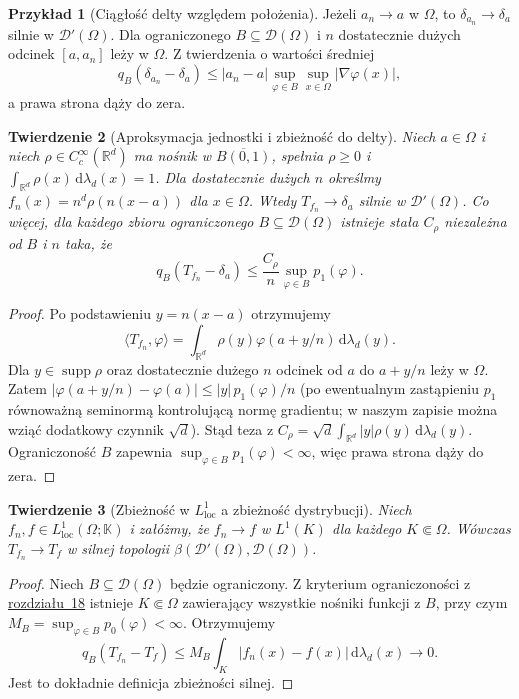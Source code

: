 \documentclass[11pt,a4paper]{article}
\numberwithin{equation}{section}
\theoremstyle{plain}
\newtheorem{twierdzenie}{Twierdzenie}[section]
\theoremstyle{definition}
\newtheorem{przyklad}[twierdzenie]{Przykład}
\theoremstyle{remark}
\newcommand{\R}{\mathbb R}
\newcommand{\K}{\mathbb K}
\DeclareMathOperator{\supp}{supp}
\begin{document}
\begin{przyklad}[Ciągłość delty względem położenia]
\label{ex:delta-continuity19}
Jeżeli $a_n\to a$ w $\Omega$, to
$\delta_{a_n}\to\delta_a$ silnie w $\mathcal D'(\Omega)$.
Dla ograniczonego $B\subseteq\mathcal D(\Omega)$
i $n$ dostatecznie dużych odcinek $[a,a_n]$ leży
w $\Omega$. Z twierdzenia o wartości średniej
\[q_B(\delta_{a_n}-\delta_a)\le
|a_n-a|\sup_{\varphi\in B}\sup_{x\in\Omega}|\nabla\varphi(x)|,
\]
a prawa strona dąży do zera.
\end{przyklad}

\begin{twierdzenie}[Aproksymacja jednostki i zbieżność do delty]
\label{thm:mollifier-delta19}
Niech $a\in\Omega$ i niech
$\rho\in C_c^\infty(\R^d)$ ma nośnik w
$\overline{B(0,1)}$, spełnia $\rho\ge0$ i
$\int_{\R^d}\rho(x)\,\mathrm d\lambda_d(x)=1$.
Dla dostatecznie dużych $n$ określmy
$f_n(x)=n^d\rho(n(x-a))$ dla $x\in\Omega$.
Wtedy $T_{f_n}\to\delta_a$ silnie w $\mathcal D'(\Omega)$.
Co więcej, dla każdego zbioru ograniczonego
$B\subseteq\mathcal D(\Omega)$ istnieje stała $C_\rho$
niezależna od $B$ i $n$ taka, że
\[q_B(T_{f_n}-\delta_a)\le
\frac{C_\rho}{n}\sup_{\varphi\in B}p_1(\varphi).\]
\end{twierdzenie}
\begin{proof}
Po podstawieniu $y=n(x-a)$ otrzymujemy
\[\langle T_{f_n},\varphi\rangle
=\int_{\R^d}\rho(y)\varphi(a+y/n)\,\mathrm d\lambda_d(y).\]
Dla $y\in\supp\rho$ oraz dostatecznie dużego $n$
odcinek od $a$ do $a+y/n$ leży w $\Omega$. Zatem
$|\varphi(a+y/n)-\varphi(a)|\le
|y|\,p_1(\varphi)/n$ (po ewentualnym zastąpieniu
$p_1$ równoważną seminormą kontrolującą normę gradientu;
w naszym zapisie można wziąć dodatkowy czynnik $\sqrt d$).
Stąd teza z
$C_\rho=\sqrt d\int_{\R^d}|y|\rho(y)\,
\mathrm d\lambda_d(y)$. Ograniczoność $B$ zapewnia
$\sup_{\varphi\in B}p_1(\varphi)<\infty$, więc prawa
strona dąży do zera.
\end{proof}



\begin{twierdzenie}[Zbieżność w $L^1_{\mathrm{loc}}$ a zbieżność dystrybucji]
\label{thm:L1-to-strong19}
Niech $f_n,f\in L^1_{\mathrm{loc}}(\Omega;\K)$ i załóżmy,
że $f_n\to f$ w $L^1(K)$ dla każdego $K\Subset\Omega$.
Wówczas $T_{f_n}\to T_f$ w silnej topologii
$\beta(\mathcal D'(\Omega),\mathcal D(\Omega))$.
\end{twierdzenie}
\begin{proof}
Niech $B\subseteq\mathcal D(\Omega)$ będzie ograniczony.
Z kryterium ograniczoności z \hyperref[sec:funkcje-testowe18]{rozdziału~18} istnieje
$K\Subset\Omega$ zawierający wszystkie nośniki funkcji
z $B$, przy czym $M_B=\sup_{\varphi\in B}p_0(\varphi)<\infty$.
Otrzymujemy
\[q_B(T_{f_n}-T_f)\le
M_B\int_K|f_n(x)-f(x)|\,\mathrm d\lambda_d(x)
\longrightarrow0.\]
Jest to dokładnie definicja zbieżności silnej.
\end{proof}
\end{document}
